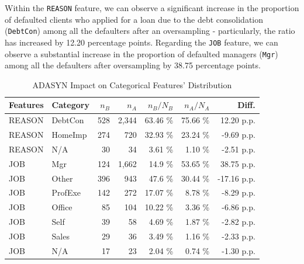 Within the \texttt{REASON} feature, we can observe a significant increase in the proportion of defaulted clients who applied for a loan due to the debt consolidation (\texttt{DebtCon}) among all the defaulters after an oversampling - particularly, the ratio has increased by 12.20 percentage points.
Regarding the \texttt{JOB} feature, we can observe a substantial increase in the proportion of defaulted managers (\texttt{Mgr}) among all the defaulters after oversampling by 38.75 percentage points.
\begin{table}[H]
    \small
    \setlength{\tabcolsep}{8pt}
    \renewcommand{\arraystretch}{1.3}
    \centering
    \caption[ADASYN Impact on Categorical Features' Distribution]{ADASYN Impact on Categorical Features' Distribution}\label{tab:adasynimpact}
    \begin{tabular}{ll|rr|rr|r}
    
        \hline
    \textbf{Features} & \textbf{Category} & \textbf{$n_{B}$} & \textbf{$n_{A}$} & \textbf{$n_{B} / N_{B}$} & \textbf{$n_{A} / N_{A}$} & \textbf{Diff.} \\ 
    \midrule
    \midrule
    REASON & DebtCon & 528 & 2,344 & 63.46 \% & 75.66 \% & 12.20 p.p. \\ 
    REASON & HomeImp & 274 & 720 & 32.93 \% & 23.24 \% & -9.69 p.p. \\
    REASON & N/A & 30 & 34 & 3.61 \% & 1.10 \% & -2.51 p.p. \\
    \hline
    JOB & Mgr & 124 & 1,662 & 14.9 \% & 53.65 \% & 38.75 p.p. \\ 
    JOB & Other & 396 & 943 & 47.6 \% & 30.44 \% & -17.16 p.p. \\ 
    JOB & ProfExe & 142 & 272 & 17.07 \% & 8.78 \% & -8.29 p.p. \\ 
    JOB & Office & 85 & 104 & 10.22 \% & 3.36 \% & -6.86 p.p. \\ 
    JOB & Self & 39 & 58 & 4.69 \% & 1.87 \% & -2.82 p.p. \\
    JOB & Sales & 29 & 36 & 3.49 \% & 1.16 \% & -2.33 p.p. \\ 
    JOB & N/A & 17 & 23 & 2.04 \% & 0.74 \% & -1.30 p.p. \\ 
    \hline
    \bottomrule
    \end{tabular}
    \vspace{0.7em}
    
    \vspace{-1em}
\end{table}
